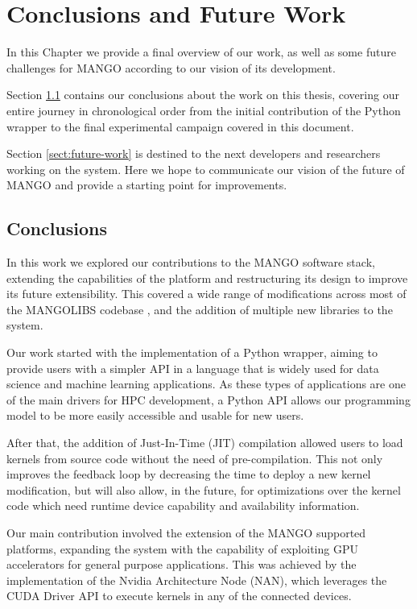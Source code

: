 \chapter{Conclusions and Future Work} \label{ch:Conclusions}

In this Chapter we provide a final overview of our work, as well as some future challenges for MANGO according to our vision of its development.

Section \ref{sect:conclusions} contains our conclusions about the work on this thesis, covering our entire journey in chronological order from the initial contribution of the Python wrapper to the final experimental campaign covered in this document.

Section \ref{sect:future-work} is destined to the next developers and researchers working on the system. Here we hope to communicate our vision of the future of MANGO and provide a starting point for improvements. 

\section{Conclusions} \label{sect:conclusions}

In this work we explored our contributions to the MANGO software stack, extending the capabilities of the platform and restructuring its design to improve its future extensibility. This covered a wide range of modifications across most of the MANGOLIBS codebase \cite{mango_repo}, and the addition of multiple new libraries to the system.

Our work started with the implementation of a Python wrapper, aiming to provide users with a simpler API in a language that is widely used for data science and machine learning applications. As these types of applications are one of the main drivers for HPC development, a Python API allows our programming model to be more easily accessible and usable for new users.

After that, the addition of Just-In-Time (JIT) compilation allowed users to load kernels from source code without the need of pre-compilation. This not only improves the feedback loop by decreasing the time to deploy a new kernel modification, but will also allow, in the future, for optimizations over the kernel code which need runtime device capability and availability information.

Our main contribution involved the extension of the MANGO supported platforms, expanding the system with the capability of exploiting GPU accelerators for general purpose applications. This was achieved by the implementation of the Nvidia Architecture Node (NAN), which leverages the CUDA Driver API to execute kernels in any of the connected devices. 

